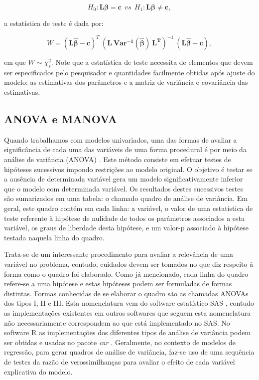 $$
H_0: \boldsymbol{L}\boldsymbol{\beta} = \boldsymbol{c} \: \:  vs \: \:  H_1: \boldsymbol{L}\boldsymbol{\beta} \neq \boldsymbol{c},
$$

\noindent a estatística de teste é dada por:

$$
W = (\boldsymbol{L\hat\beta} - \boldsymbol{c})^T \ (\boldsymbol{L \ Var^{-1}(\hat\beta) \ L^T})^{-1} \ (\boldsymbol{L\hat\beta} - \boldsymbol{c}),
$$

\noindent em que $W \sim \chi^2_s$. Note que a estatística de teste necessita de elementos que devem ser especificados pelo pesquisador e quantidades facilmente obtidas após ajuste do modelo: as estimativas dos parâmetros e a matriz de variância e covariância das estimativas.

\subsection{ANOVA e MANOVA}

Quando trabalhamos com modelos univariados, uma das formas de avaliar a significância de cada uma das variáveis de uma forma procedural é por meio da análise de variância (ANOVA) \citep{anova_fisher}. Este método consiste em efetuar testes de hipóteses sucessivos impondo restrições ao modelo original. O objetivo é testar se a ausência de determinada variável gera um modelo significativamente inferior que o modelo com determinada variável. Os resultados destes sucessivos testes são sumarizados em uma tabela: o chamado quadro de análise de variância. Em geral, este quadro contém em cada linha: a variável, o valor de uma estatística de teste referente à hipótese de nulidade de todos os parâmetros associados a esta variável, os graus de liberdade desta hipótese, e um valor-p associado à hipótese testada naquela linha do quadro.

Trata-se de um interessante procedimento para avaliar a relevância de uma variável no problema, contudo, cuidados devem ser tomados no que diz respeito à forma como o quadro foi elaborado. Como já mencionado, cada linha do quadro refere-se a uma hipótese e estas hipóteses podem ser formuladas de formas distintas. Formas conhecidas de se elaborar o quadro são as chamadas ANOVAs dos tipos I, II e III. Esta nomenclatura vem do software estatístico SAS \citep{sas}, contudo as implementações existentes em outros softwares que seguem esta nomenclatura não necessariamente correspondem ao que está implementado no SAS. No software R \citep{softwareR} as implementações dos diferentes tipos de análise de variância podem ser obtidas e usadas no pacote \emph{car} \citep{car}. Geralmente, no contexto de modelos de regressão, para gerar quadros de análise de variância, faz-se uso de uma sequência de testes da razão de verossimilhanças para avaliar o efeito de cada variável explicativa do modelo. 

